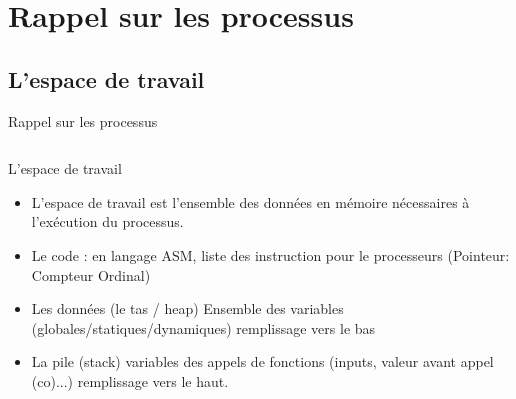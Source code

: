 \def\sectitle{Rappel sur les processus}
\section{\sectitle}

\def\subsectitle{L'espace de travail}
\subsection{\subsectitle}
\begin{frame}{\sectitle}
\begin{columns}[c]
\begin{block}{\subsectitle}
\begin{itemize}
\item L'espace de travail est l'ensemble des données en mémoire nécessaires à l'exécution du processus.
\item Le code : en langage ASM, liste des instruction pour le processeurs (Pointeur: Compteur Ordinal)
\item Les données (le tas / heap) Ensemble des variables
(globales/statiques/dynamiques) remplissage vers le bas
\item La pile (stack) variables des appels de fonctions (inputs, valeur avant
appel (co)...) remplissage vers le haut.
\end{itemize}
\end{block}


\end{columns}
\end{frame}
